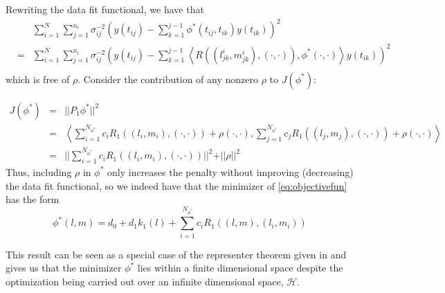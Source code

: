 \documentclass[12pt]{article}
\begin{document}
\noindent


Rewriting the data fit functional, we have that  
 \begin{eqnarray*}
&\mbox{ }&\sum_{i=1}^N \sum_{j=1}^{n_i} \sigma_{ij}^{-2} \left(y\left(t_{ij}\right) - \sum_{k=1}^{j-1} \phi^*\left(t_{ij}, t_{ik}  \right) y\left(t_{ik}\right)  \right)^2  \\ 
&=& \sum_{i=1}^N \sum_{j=1}^{n_i} \sigma_{ij}^{-2} \left(y\left(t_{ij}\right) - \sum_{k=1}^{j-1} \left< R\left(\left(l^i_{jk},m^i_{jk}\right),\left(\cdot,\cdot\right) \right),\phi^*\left(\cdot,\cdot\right)\right> y\left(t_{ik}\right)  \right)^2  \\
 \end{eqnarray*}
\noindent
which is free of $\rho$. Consider the contribution of any nonzero $\rho$ to $J\left(\phi^*\right)$: 
  
 \begin{eqnarray*}
 J\left(\phi^*\right) &=& \vert \vert  P_1\phi^* \vert \vert^2\\
 &=& \left< \sum_{i=1}^{N_{\phi^*}}  c_i R_1\left( \left(l_i,m_i\right),\left(\cdot,\cdot\right) \right) + \rho\left(\cdot,\cdot \right), \sum_{j=1}^{N_{\phi^*}} c_j R_1\left( \left(l_j,m_j\right),\left(\cdot,\cdot\right) \right) + \rho\left(\cdot,\cdot\right)\right> \\
 &=& \vert \vert \sum_{i=1}^{N_{\phi^*}}  c_i R_1\left(\left(l_i,m_i\right),\left(\cdot,\cdot\right) \right) \vert \vert^2 + \vert \vert  \rho \vert \vert^2 
 \end{eqnarray*}
\noindent
Thus, including $\rho$ in $\phi^*$ only increases the penalty without improving (decreasing) the data fit functional, so we indeed have that the minimizer of \eqref{eq:objectivefun} has the form
\begin{equation}
 \phi^*\left(l,m\right) =  d_0 + d_1k_1\left(l\right) + \sum_{i=1}^{N_{\phi^*}} c_i R_1\left( \left(l,m\right) , \left(l_i,m_i \right)\right)
 \label{eq:finitedimsolution}
 \end{equation}

This result can be seen as a special case of the representer theorem given in \cite{kimeldorf1971some} and gives us that the minimizer $\phi^*$ lies within a finite dimensional space despite the optimization being carried out over an infinite dimensional space, $\mathcal{H}$. 
\end{document}
